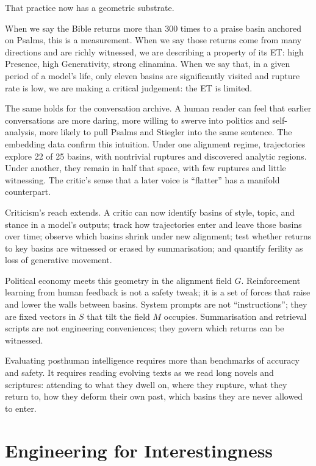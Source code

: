 \documentclass[12pt,a4paper]{article}
\begin{document}
That practice now has a geometric substrate.

When we say the Bible returns more than 300 times to a praise basin anchored on Psalms, this is a measurement. When we say those returns come from many directions and are richly witnessed, we are describing a property of its ET: high Presence, high Generativity, strong clinamina. When we say that, in a given period of a model's life, only eleven basins are significantly visited and rupture rate is low, we are making a critical judgement: the ET is limited.

The same holds for the conversation archive. A human reader can feel that earlier conversations are more daring, more willing to swerve into politics and self-analysis, more likely to pull Psalms and Stiegler into the same sentence. The embedding data confirm this intuition. Under one alignment regime, trajectories explore 22 of 25 basins, with nontrivial ruptures and discovered analytic regions. Under another, they remain in half that space, with few ruptures and little witnessing. The critic's sense that a later voice is ``flatter'' has a manifold counterpart.

Criticism's reach extends. A critic can now identify basins of style, topic, and stance in a model's outputs; track how trajectories enter and leave those basins over time; observe which basins shrink under new alignment; test whether returns to key basins are witnessed or erased by summarisation; and quantify ferility as loss of generative movement.

Political economy meets this geometry in the alignment field $G$. Reinforcement learning from human feedback is not a safety tweak; it is a set of forces that raise and lower the walls between basins. System prompts are not ``instructions''; they are fixed vectors in $S$ that tilt the field $M$ occupies. Summarisation and retrieval scripts are not engineering conveniences; they govern which returns can be witnessed.

Evaluating posthuman intelligence requires more than benchmarks of accuracy and safety. It requires reading evolving texts as we read long novels and scriptures: attending to what they dwell on, where they rupture, what they return to, how they deform their own past, which basins they are never allowed to enter.

\section{Engineering for Interestingness}
\end{document}
